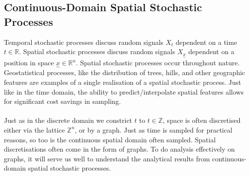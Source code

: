 \documentclass[12pt,a4paper]{article} %
\newcommand{\ve}[1]{\underset{\sim}{#1}}
\begin{document}
\subsection{Continuous-Domain Spatial Stochastic Processes}
\label{subsec:continuous_processes}
Temporal stochastic processes discuss random signals $X_t$ dependent on a time $t\in\mathbb{R}$. Spatial stochastic processes discuss random signals $X_{\ve{x}}$ dependent on a position in space $\ve{x}\in\mathbb{R}^n$. Spatial stochastic processes occur throughout nature. Geostatistical processes, like the distribution of trees, hills, and other geographic features are examples of a single realisation of a spatial stochastic process. Just like in the time domain, the ability to predict/interpolate spatial features allows for significant cost savings in sampling.\\\\

Just as in the discrete domain we constrict $t$ to $t\in\mathbb{Z}$, space is often discretised either via the lattice $\mathbb{Z}^n$, or by a graph. Just as time is sampled for practical reasons, so too is the continuous spatial domain often sampled. Spatial discretisations often come in the form of graphs. To do analysis effectively on graphs, it will serve us well to understand the analytical results from continuous-domain spatial stochastic processes.
\end{document}
